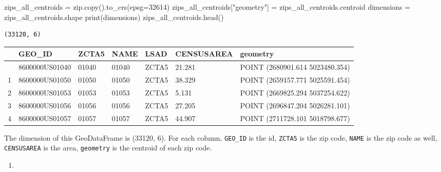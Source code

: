 \documentclass[
  letterpaper,
  DIV=11,
  numbers=noendperiod]{scrartcl}
\newenvironment{Shaded}{\begin{snugshade}}{\end{snugshade}}
\newcommand{\BuiltInTok}[1]{\textcolor[rgb]{0.00,0.23,0.31}{#1}}
\newcommand{\DecValTok}[1]{\textcolor[rgb]{0.68,0.00,0.00}{#1}}
\newcommand{\NormalTok}[1]{\textcolor[rgb]{0.00,0.23,0.31}{#1}}
\newcommand{\OperatorTok}[1]{\textcolor[rgb]{0.37,0.37,0.37}{#1}}
\newcommand{\StringTok}[1]{\textcolor[rgb]{0.13,0.47,0.30}{#1}}
\providecommand{\tightlist}{%
  \setlength{\itemsep}{0pt}\setlength{\parskip}{0pt}}\usepackage{longtable,booktabs,array}
\begin{document}
\begin{Shaded}
\begin{Highlighting}[]
\NormalTok{zips\_all\_centroids }\OperatorTok{=} \BuiltInTok{zip}\NormalTok{.copy().to\_crs(epsg}\OperatorTok{=}\DecValTok{32614}\NormalTok{)}
\NormalTok{zips\_all\_centroids[}\StringTok{"geometry"}\NormalTok{] }\OperatorTok{=}\NormalTok{ zips\_all\_centroids.centroid}
\NormalTok{dimensions }\OperatorTok{=}\NormalTok{ zips\_all\_centroids.shape}
\BuiltInTok{print}\NormalTok{(dimensions)}
\NormalTok{zips\_all\_centroids.head()}
\end{Highlighting}
\end{Shaded}

\begin{verbatim}
(33120, 6)
\end{verbatim}

\begin{longtable}[]{@{}lllllll@{}}
\toprule\noalign{}
& GEO\_ID & ZCTA5 & NAME & LSAD & CENSUSAREA & geometry \\
\midrule\noalign{}
\endhead
\bottomrule\noalign{}
\endlastfoot
0 & 8600000US01040 & 01040 & 01040 & ZCTA5 & 21.281 & POINT (2680901.614
5023480.354) \\
1 & 8600000US01050 & 01050 & 01050 & ZCTA5 & 38.329 & POINT (2659157.771
5025591.454) \\
2 & 8600000US01053 & 01053 & 01053 & ZCTA5 & 5.131 & POINT (2669825.294
5037254.622) \\
3 & 8600000US01056 & 01056 & 01056 & ZCTA5 & 27.205 & POINT (2696847.204
5026281.101) \\
4 & 8600000US01057 & 01057 & 01057 & ZCTA5 & 44.907 & POINT (2711728.101
5018798.677) \\
\end{longtable}

The dimension of this GeoDataFrame is (33120, 6). For each column,
\texttt{GEO\_ID} is the id, \texttt{ZCTA5} is the zip code,
\texttt{NAME} is the zip code as well, \texttt{CENSUSAREA} is the area,
\texttt{geometry} is the centroid of each zip code.

\begin{enumerate}
\def\labelenumi{\arabic{enumi}.}
\setcounter{enumi}{1}
\tightlist
\item
\end{enumerate}
\end{document}
